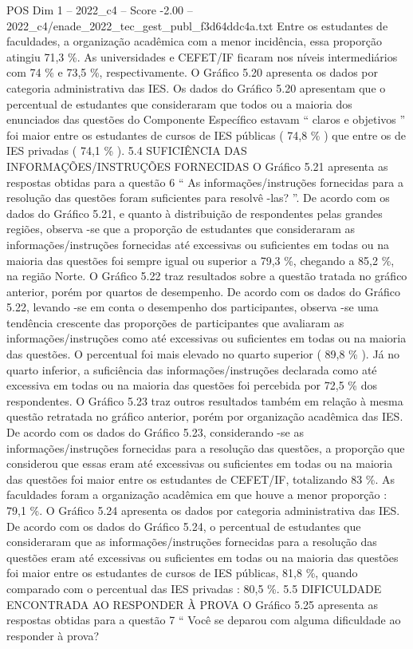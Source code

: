 \begin{textsample}{POS Dim 1 – 2022\_c4 – Score -2.00 – 2022\_c4/enade\_2022\_tec\_gest\_publ\_f3d64ddc4a.txt}
Entre os estudantes de faculdades, a organização acadêmica com a menor incidência, essa proporção atingiu 71,3 \%.
As universidades e CEFET/IF ficaram nos níveis intermediários com 74 \% e 73,5 \%, respectivamente.
O Gráfico 5.20 apresenta os dados por categoria administrativa das IES.
Os dados do Gráfico 5.20 apresentam que o percentual de estudantes que consideraram que todos ou a maioria dos enunciados das questões do Componente Específico estavam “ claros e objetivos ” foi maior entre os estudantes de cursos de IES públicas ( 74,8 \% ) que entre os de IES privadas ( 74,1 \% ). 5.4 SUFICIÊNCIA DAS INFORMAÇÕES/INSTRUÇÕES FORNECIDAS O Gráfico 5.21 apresenta as respostas obtidas para a questão 6 “ As informações/instruções fornecidas para a resolução das questões foram suficientes para resolvê -las? ”.
De acordo com os dados do Gráfico 5.21, e quanto à distribuição de respondentes pelas grandes regiões, observa -se que a proporção de estudantes que consideraram as informações/instruções fornecidas até excessivas ou suficientes em todas ou na maioria das questões foi sempre igual ou superior a 79,3 \%, chegando a 85,2 \%, na região Norte.
O Gráfico 5.22 traz resultados sobre a questão tratada no gráfico anterior, porém por quartos de desempenho.
De acordo com os dados do Gráfico 5.22, levando -se em conta o desempenho dos participantes, observa -se uma tendência crescente das proporções de participantes que avaliaram as informações/instruções como até excessivas ou suficientes em todas ou na maioria das questões.
O percentual foi mais elevado no quarto superior ( 89,8 \% ).
Já no quarto inferior, a suficiência das informações/instruções declarada como até excessiva em todas ou na maioria das questões foi percebida por 72,5 \% dos respondentes.
O Gráfico 5.23 traz outros resultados também em relação à mesma questão retratada no gráfico anterior, porém por organização acadêmica das IES.
De acordo com os dados do Gráfico 5.23, considerando -se as informações/instruções fornecidas para a resolução das questões, a proporção que considerou que essas eram até excessivas ou suficientes em todas ou na maioria das questões foi maior entre os estudantes de CEFET/IF, totalizando 83 \%.
As faculdades foram a organização acadêmica em que houve a menor proporção : 79,1 \%.
O Gráfico 5.24 apresenta os dados por categoria administrativa das IES.
De acordo com os dados do Gráfico 5.24, o percentual de estudantes que consideraram que as informações/instruções fornecidas para a resolução das questões eram até excessivas ou suficientes em todas ou na maioria das questões foi maior entre os estudantes de cursos de IES públicas, 81,8 \%, quando comparado com o percentual das IES privadas : 80,5 \%. 5.5 DIFICULDADE ENCONTRADA AO RESPONDER À PROVA O Gráfico 5.25 apresenta as respostas obtidas para a questão 7 “ Você se deparou com alguma dificuldade ao responder à prova?

\end{textsample}

